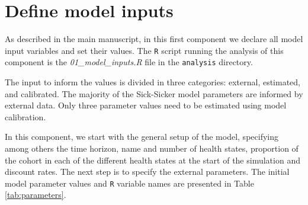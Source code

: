 \documentclass[]{book}
\begin{document}
\hypertarget{inputs}{%
\chapter{Define model inputs}\label{inputs}}

As described in the main manuscript, in this first component we declare all model input variables and set their values. The \texttt{R} script running the analysis of this component is the \emph{01\_model\_inputs.R} file in the \texttt{analysis} directory.

The input to inform the values is divided in three categories: external, estimated, and calibrated. The majority of the Sick-Sicker model parameters are informed by external data. Only three parameter values need to be estimated using model calibration.

In this component, we start with the general setup of the model, specifying among others the time horizon, name and number of health states, proportion of the cohort in each of the different health states at the start of the simulation and discount rates. The next step is to specify the external parameters. The initial model parameter values and \texttt{R} variable names are presented in Table \ref{tab:parameters}.
\end{document}
